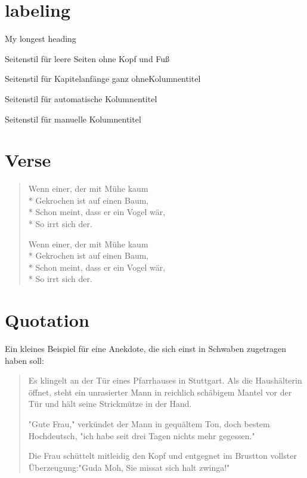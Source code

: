 \section{labeling}
\begin{labeling}[ ]{My longest heading}
	\item[empty]Seitenstil für leere Seiten ohne Kopf und Fuß
	\item[plain]Seitenstil für Kapitelanfänge ganz ohneKolumnentitel
	\item[headings]Seitenstil für automatische Kolumnentitel
	\item[my longest heading]Seitenstil für manuelle Kolumnentitel
\end{labeling}


\section{Verse}
\begin{verse}
	Wenn einer, der mit Mühe kaum\\*
	Gekrochen ist auf einen Baum,\\*
	Schon meint, dass er ein Vogel wär,\\*
	So irrt sich der.
    \par
	Wenn einer, der mit Mühe kaum\\*
	Gekrochen ist auf einen Baum,\\*
	Schon meint, dass er ein Vogel wär,\\*
	So irrt sich der.
	
\end{verse}

\section{Quotation}
	Ein kleines Beispiel für eine Anekdote, die sich einst in Schwaben zugetragen haben soll:
	\begin{quotation}
		Es klingelt an der Tür eines Pfarrhauses in Stuttgart. Als die Haushälterin öffnet, steht ein unrasierter Mann in reichlich schäbigem Mantel vor der Tür und hält seine Strickmütze in der Hand.
		
		"Gute Frau," verkündet der Mann in gequältem Ton, doch bestem Hochdeutsch, "ich habe seit drei Tagen nichts mehr gegessen."
		
		Die Frau schüttelt mitleidig den Kopf und entgegnet im Brustton vollster Überzeugung:"Guda Moh, Sie missat sich halt zwinga!"
	\end{quotation}

